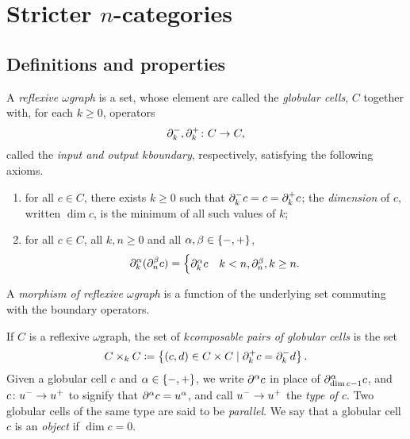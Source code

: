 \section{Stricter \texorpdfstring{$n$}{n}-categories}

\subsection{Definitions and properties}

\begin{dfn} 
    A \emph{reflexive \( \omega \)\nbd graph} is a set, whose element are called the \emph{globular cells}, \( C \) together with, for each \( k \geq 0 \), operators
    \begin{equation*}
        \partial_{k}^{-}, \partial_{k}^{+} \colon C \to C,
    \end{equation*}
    called the \emph{input and output \( k \)\nbd boundary}, respectively, satisfying the following axioms.
    \begin{enumerate}
        \item for all \( c \in C \), there exists \( k \geq 0 \) such that \( \partial_{k}^{-} c = c = \partial_{k}^{+} c \); the \emph{dimension} of \( c \), written \( \dim c \), is the minimum of all such values of \( k \);
        \item for all \( c \in C \), all \( k, n \geq 0 \) and all \( \alpha, \beta \in \left\{ {-, +} \right\} \),
        \begin{equation*}
            \partial_{k}^{\alpha}(\partial_{n}^{\beta} c) = 
            \begin{cases}
                \partial_{k}^{\alpha} c & k < n,
                \partial_{n}^{\beta}, k \ge n.
            \end{cases}
        \end{equation*}
    \end{enumerate}
    A \emph{morphism of reflexive \( \omega \)\nbd graph} is a function of the underlying set commuting with the boundary operators.
\end{dfn}

\noindent If \( C \) is a reflexive \( \omega \)\nbd graph, the set of \emph{\( k \)\nbd composable pairs of globular cells} is the set 
\begin{equation*}
    C \times_k C \coloneqq \left\{ {(c, d) \in C \times C \mid \partial_{k}^{+} c = \partial_{k}^{-} d} \right\}.
\end{equation*}
Given a globular cell \( c \) and \( \alpha \in \left\{ {-, +} \right\} \), we write \( \partial_{}^{\alpha} c \) in place of \( \partial_{\dim c - 1}^{\alpha} c \), and \( c \colon u^- \to u^+ \) to signify that \( \partial_{}^{\alpha} c = u^\alpha \), and call \( u^- \to u^+ \) the \emph{type of \( c \)}. 
Two globular cells of the same type are said to be \emph{parallel}.
We say that a globular cell \( c \) is an \emph{object} if \( \dim c = 0 \). 


